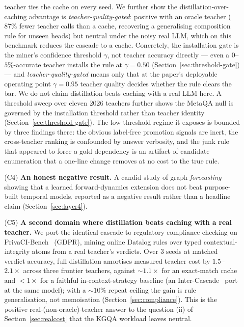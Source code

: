 \documentclass[11pt]{article}
\theoremstyle{plain}
\begin{document}
\begin{enumerate}
  teacher ties the cache on every seed. We
  further show the distillation-over-caching advantage is
  \emph{teacher-quality-gated}: positive with an oracle teacher ($87\%$ fewer
  teacher calls than a cache, recovering a generalising composition rule for
  unseen heads) but neutral under the noisy real LLM, which on this benchmark
  reduces the cascade to a cache. Concretely, the installation gate is the
  miner's confidence threshold $\gamma$, not teacher accuracy directly --- even a
  $0$--$5\%$-accurate teacher installs the rule at $\gamma{=}0.50$
  (Section~\ref{sec:threshold-gate}) --- and \emph{teacher-quality-gated} means
  only that at the paper's deployable operating point $\gamma{=}0.95$ teacher
  quality decides whether the rule clears the bar. We do not claim distillation
  beats caching with a real LLM here. A threshold sweep over eleven 2026 teachers further
  shows the MetaQA null is governed by the installation threshold rather than
  teacher identity (Section~\ref{sec:threshold-gate}). The low-threshold regime
  it exposes is bounded by three findings there: the obvious label-free
  promotion signals are inert, the cross-teacher ranking is confounded by answer
  verbosity, and the junk rule that appeared to force a gold dependency is an
  artifact of candidate enumeration that a one-line change removes at no cost to
  the true rule.
  \item[(C4)] \textbf{An honest negative result.} A candid study of graph
  \emph{forecasting} showing that a learned forward-dynamics extension does
  not beat purpose-built temporal models, reported as a negative result
  rather than a headline claim (Section~\ref{sec:layer4}).
  \item[(C5)] \textbf{A second domain where distillation beats caching with a
  real teacher.} We port the identical cascade to regulatory-compliance
  checking on PrivaCI-Bench~\citep{privacibench2025} (GDPR), mining online
  Datalog rules over typed contextual-integrity atoms from a real teacher's
  verdicts. Over $3$ seeds at matched verdict accuracy, full distillation
  amortises measured teacher cost by $1.5$--$2.1\times$ across three frontier
  teachers, against ${\sim}1.1\times$ for an exact-match cache and ${<}1\times$
  for a faithful in-context-strategy baseline (an Inter-Cascade~\citep{intercascade2025}
  port at the same model); with a ${\sim}10\%$ repeat ceiling the gain is rule
  generalisation, not memoisation (Section~\ref{sec:compliance}). This is the
  positive real-(non-oracle)-teacher answer to the question (ii) of
  Section~\ref{sec:realcost} that the KGQA workload leaves neutral.
\end{enumerate}
\end{document}
